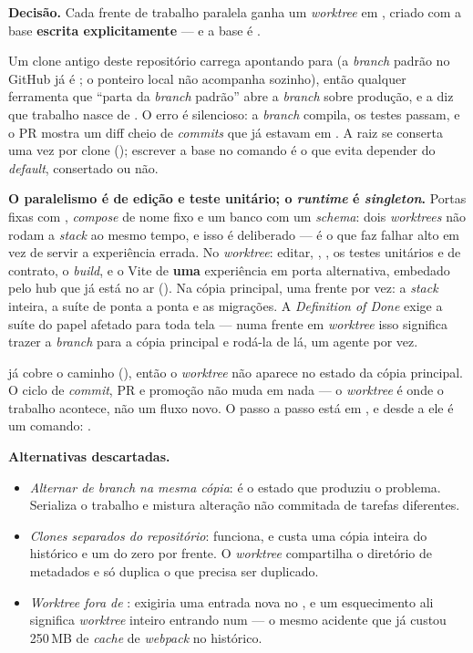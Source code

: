 \textbf{Decisão.} Cada frente de trabalho paralela ganha um \emph{worktree} em
, criado com a base \textbf{escrita
explicitamente} --- e a base é .

Um clone antigo deste repositório carrega  apontando para
 (a \emph{branch} padrão no GitHub já é ; o ponteiro
local não acompanha sozinho), então qualquer ferramenta que \enquote{parta da
\emph{branch} padrão} abre a \emph{branch} sobre produção, e a 
diz que trabalho nasce de . O erro é silencioso: a \emph{branch}
compila, os testes passam, e o PR mostra um diff cheio de \emph{commits} que já
estavam em . A raiz se conserta uma vez por clone
(); escrever a base no comando é o que
evita depender do \emph{default}, consertado ou não.

\textbf{O paralelismo é de edição e teste unitário; o \emph{runtime} é
\emph{singleton}.} Portas fixas com , \emph{compose} de nome
fixo e um banco com um \emph{schema}: dois \emph{worktrees} não rodam a
\emph{stack} ao mesmo tempo, e isso é deliberado --- é o que faz 
falhar alto em vez de servir a experiência errada. No \emph{worktree}: editar,
, , os testes unitários e de contrato, o \emph{build},
e o Vite de \textbf{uma} experiência em porta alternativa, embedado pelo hub
que já está no ar (). Na cópia principal, uma frente por
vez: a \emph{stack} inteira, a suíte de ponta a ponta e as migrações. A
\emph{Definition of Done} exige a suíte do papel afetado para toda tela ---
numa frente em \emph{worktree} isso significa trazer a \emph{branch} para a
cópia principal e rodá-la de lá, um agente por vez.

 já cobre o caminho (), então o \emph{worktree}
não aparece no estado da cópia principal. O ciclo de \emph{commit}, PR e
promoção não muda em nada --- o \emph{worktree} é onde o trabalho acontece, não
um fluxo novo. O passo a passo está em , e desde a
 ele é um comando: .

\textbf{Alternativas descartadas.}
\begin{itemize}
  \item \emph{Alternar de \emph{branch} na mesma cópia}: é o estado que
    produziu o problema. Serializa o trabalho e mistura alteração não
    commitada de tarefas diferentes.
  \item \emph{Clones separados do repositório}: funciona, e custa uma cópia
    inteira do histórico e um  do zero por frente. O
    \emph{worktree} compartilha o diretório de metadados e só duplica o que
    precisa ser duplicado.
  \item \emph{\emph{Worktree} fora de }: exigiria uma entrada
    nova no , e um esquecimento ali significa \emph{worktree}
    inteiro entrando num  --- o mesmo acidente que já custou 250\,MB
    de \emph{cache} de \emph{webpack} no histórico.
\end{itemize}


